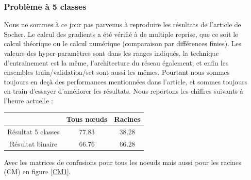 \documentclass[conference]{IEEEtran}
\begin{document}
\subsubsection{Problème à 5 classes}
Nous ne sommes à ce jour pas parvenus à reproduire les résultats de l'article de Socher. Le calcul des gradients a été vérifié à de multiple reprise, que ce soit le calcul théorique ou le calcul numérique (comparaison par différences finies). Les valeurs des hyper-paramètres sont dans les ranges indiqués, la technique d'entrainement est la même, l'architecture du réseau également, et enfin les ensembles train/validation/set sont aussi les mêmes. Pourtant nous sommes toujours en deçà des performances mentionnées dans l'article, et sommes toujours en train d'essayer d'améliorer les résultats. Nous reportons les chiffres suivants à l'heure actuelle :

\begin{center}
\begin{tabular}{|c|c|c|}
\hline
& Tous nœuds & Racines\\ \hline
Résultat 5 classes & 77.83 & 38.28  \\ \hline
Résultat binaire & 66.76 & 66.28 \\ \hline
\end{tabular}
\end{center}

Avec les matrices de confusions pour tous les noeuds mais aussi pour les racines (CM) en figure \ref{CM1}.
\end{document}
